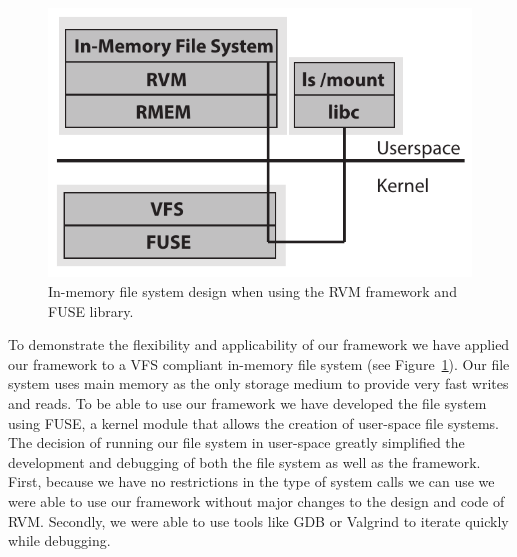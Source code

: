 
\begin{figure}[t!]
\begin{center}
\includegraphics[scale=0.60]{graphs/inmem_fs_design.pdf}
\end{center}
\caption{In-memory file system design when using the RVM framework and FUSE library.}
\label{fig:inmem_fs_design}
\end{figure}

To demonstrate the flexibility and applicability of our framework we have applied our framework to a VFS compliant in-memory file system (see Figure~\ref{fig:inmem_fs_design}). 
Our file system uses main memory as the only storage medium to provide very fast writes and reads. 
To be able to use our framework we have developed the file system using FUSE, a kernel module that allows the creation of user-space file systems.
The decision of running our file system in user-space greatly simplified the development and debugging of both the file system as well as the framework. 
First, because we have no restrictions in the type of system calls we can use we were able to use our framework without major changes to the design and code of RVM.
Secondly, we were able to use tools like GDB or Valgrind to iterate quickly while debugging.



